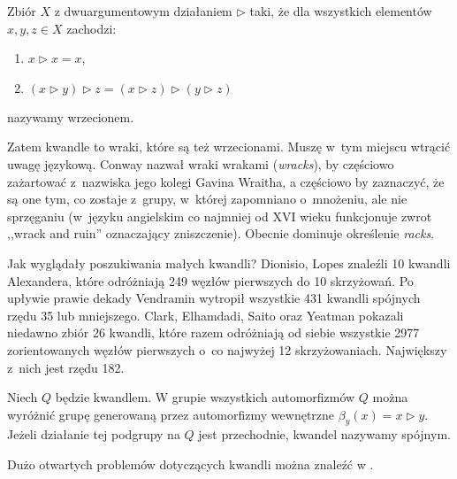 \begin{definition}[wrzeciono]
%
    Zbiór $X$ z dwuargumentowym działaniem $\triangleright$ taki, że dla wszystkich elementów $x, y, z \in X$ zachodzi:
    \begin{enumerate}
        \item $x \triangleright x = x$,
        \item $(x \triangleright y) \triangleright z = (x \triangleright z) \triangleright (y \triangleright z)$
    \end{enumerate}
    nazywamy wrzecionem.
\end{definition}

Zatem kwandle to wraki, które są też wrzecionami.
Muszę w~tym miejscu wtrącić uwagę językową.
Conway nazwał wraki wrakami (\emph{wracks}), by częściowo zażartować z~nazwiska jego kolegi Gavina Wraitha, a częściowo by zaznaczyć, że są one tym, co zostaje z~grupy, w~której zapomniano o~mnożeniu, ale nie sprzęganiu (w~języku angielskim co najmniej od XVI wieku funkcjonuje zwrot ,,wrack and ruin'' oznaczający zniszczenie).
%
%
Obecnie dominuje określenie \emph{racks}.

Jak wyglądały poszukiwania małych kwandli?
Dionisio, Lopes \cite{lopes03} znaleźli 10 kwandli Alexandera, które odróżniają 249 węzłów pierwszych do 10 skrzyżowań.
%
%
Po upływie prawie dekady Vendramin \cite{vendramin12} wytropił wszystkie 431 kwandli spójnych rzędu 35 lub mniejszego.
%
Clark, Elhamdadi, Saito oraz Yeatman \cite{clark13} pokazali niedawno zbiór 26 kwandli, które razem odróżniają od siebie wszystkie 2977 zorientowanych węzłów pierwszych o~co najwyżej 12 skrzyżowaniach.
%
%
%
%
Największy z~nich jest rzędu 182.

\begin{definition}
%
    Niech $Q$ będzie kwandlem.
    W grupie wszystkich automorfizmów $Q$ można wyróżnić grupę generowaną przez automorfizmy wewnętrzne $\beta_y(x) = x \triangleright y$.
    Jeżeli działanie tej podgrupy na $Q$ jest przechodnie, kwandel nazywamy spójnym.
\end{definition}

Dużo otwartych problemów dotyczących kwandli można znaleźć w \cite[s. 455-465]{ohtsuki02}.



